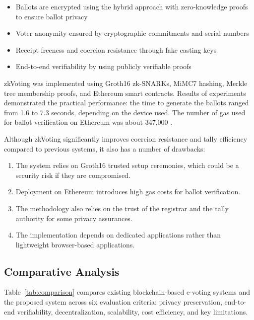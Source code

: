 \documentclass[12pt, a4paper]{report}
\begin{document}
\begin{itemize}
    \item Ballots are encrypted using the hybrid approach with zero-knowledge proofs to ensure ballot privacy
    \item Voter anonymity ensured by cryptographic commitments and serial numbers
    \item Receipt freeness and coercion resistance through fake casting keys
    \item End-to-end verifiability by using publicly verifiable proofs
\end{itemize}

zkVoting was implemented using Groth16 zk-SNARKs, MiMC7 hashing, Merkle tree membership proofs, and Ethereum smart contracts. Results of experiments demonstrated the practical performance: the time to generate the ballots ranged from 1.6 to 7.3 seconds, depending on the device used. The number of gas used for ballot verification on Ethereum was about 347,000  \cite{park2024zkvoting}.

Although zkVoting significantly improves coercion resistance and tally efficiency compared to previous systems, it also has a number of drawbacks:

\begin{enumerate}
    \item The system relies on Groth16 trusted setup ceremonies, which could be a security risk if they are compromised. 
    
    \item Deployment on Ethereum introduces high gas costs for ballot verification.
    
    \item The methodology also relies on the trust of the registrar and the tally authority for some privacy assurances.
    
    \item The implementation depends on dedicated applications rather than lightweight browser-based applications.
\end{enumerate}


\subsection{Comparative Analysis}

Table~\ref{tab:comparison} compares existing blockchain-based e-voting systems and the proposed system across six evaluation criteria: privacy preservation, end-to-end verifiability, decentralization, scalability, cost efficiency, and key limitations.
\end{document}
